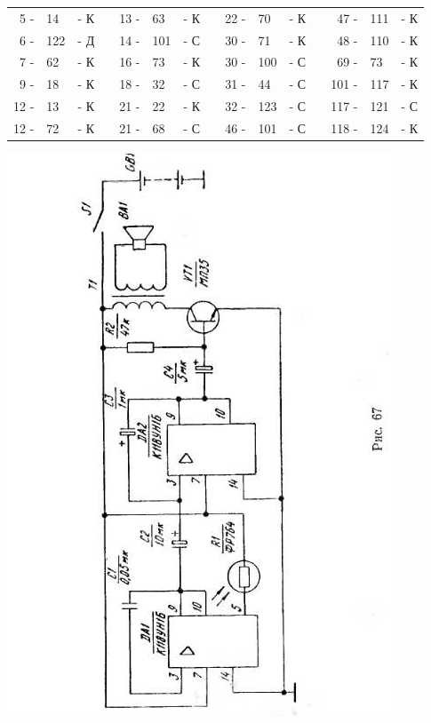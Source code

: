 \documentclass[12pt]{article}
\begin{document}
\hrulefill

\begin{tabular}{r l r p{0.5cm} r l r p{0.5cm} r l r p{0.5cm} r l r}
 5 - &  14 & - К &   & 13 - &  63 & - К &   &  22 - &  70 & - К &   &  47 - & 111  & - К\\
 6 - & 122 & - Д &   & 14 - & 101 & - С &   &  30 - &  71 & - К &   &  48 - & 110  & - К\\
 7 - &  62 & - К &   & 16 - &  73 & - К &   &  30 - & 100 & - С &   &  69 - &  73  & - К\\
 9 - &  18 & - К &   & 18 - &  32 & - С &   &  31 - &  44 & - С &   & 101 - & 117  & - К\\
12 - &  13 & - К &   & 21 - &  22 & - К &   &  32 - & 123 & - С &   & 117 - & 121  & - С\\
12 - &  72 & - К &   & 21 - &  68 & - С &   &  46 - & 101 & - С &   & 118 - & 124  & - К\\
\end{tabular}

\hrulefill

\newpage

\includegraphics[scale=1, angle=-0.5]{ekon3_067_1}
\end{document}
